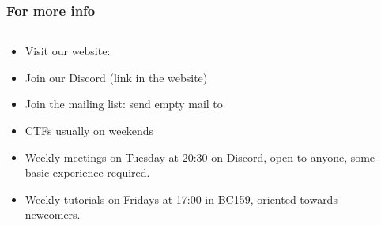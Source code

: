 \documentclass[aspectratio=169]{beamer}
\begin{document}
\begin{frame}
    \frametitle{For more info}
    \begin{columns}
        \begin{column}{0.7\textwidth}
            \begin{itemize}
                \item Visit our website: {}
				\item Join our Discord (link in the website)
                \item Join the mailing list: send empty mail to {}
                \vspace{1em}
                \item CTFs usually on weekends
                \item Weekly meetings on Tuesday at 20:30 on Discord, open to anyone, some basic experience required. 
				\item Weekly tutorials on Fridays at 17:00 in BC159, oriented towards newcomers.
            \end{itemize}
        \end{column}
        \begin{column}{0.3\textwidth}
            
        \end{column}
    \end{columns}
\end{frame}
\end{document}

